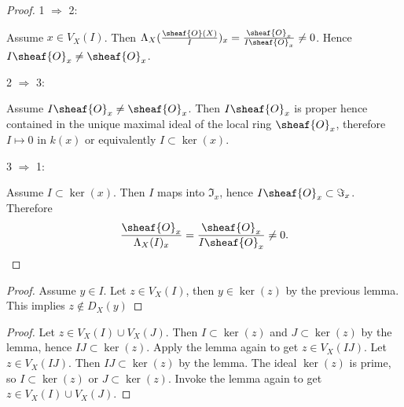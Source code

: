 
\begin{proof}
1 $\Rightarrow$ 2:

Assume $x\in V_X(I)$. 
Then $\Lambda_X(\frac{\sheaf{O}(X)}{I})_x = \frac{\sheaf{O}_x}{I\sheaf{O}_x} \neq 0$. 
Hence $I\sheaf{O}_x \neq \sheaf{O}_x$.

2 $\Rightarrow$ 3: 

Assume $I\sheaf{O}_x\neq \sheaf{O}_x$. 
Then $I\sheaf{O}_x$ is proper hence contained in the unique maximal ideal of the local ring $\sheaf{O}_x$, 
therefore $I\mapsto 0$ in $k(x)$ or equivalently $I\subset \ker(x)$.

3 $\Rightarrow$ 1:

Assume $I \subset \ker(x)$. Then $I$ maps into $\Im_x$, hence $I\sheaf{O}_x \subset \Im_x$. Therefore 
\[\frac{\sheaf{O}_x}{\Lambda_X(I)_x} = \frac{\sheaf{O}_x}{I\sheaf{O}_x} \neq 0.\]

\end{proof}
\begin{proof}
Assume $y\in I$.
Let $z\in V_X(I)$, then $y\in \ker(z)$ by the previous lemma.
This implies $z\not\in D_X(y)$
\end{proof}
\begin{proof}
Let $z\in V_X(I)\cup V_X(J)$. Then $I\subset \ker(z)$ and $J\subset \ker(z)$ by the lemma, hence $IJ\subset \ker(z)$.
Apply the lemma again to get $z\in V_X(IJ)$.
Let $z\in V_X(IJ)$. Then $IJ \subset \ker(z)$ by the lemma. The ideal $\ker(z)$ is prime, so $I\subset \ker(z)$ or $J\subset \ker(z)$. Invoke the lemma again to get $z\in V_X(I)\cup V_X(J)$.
\end{proof}